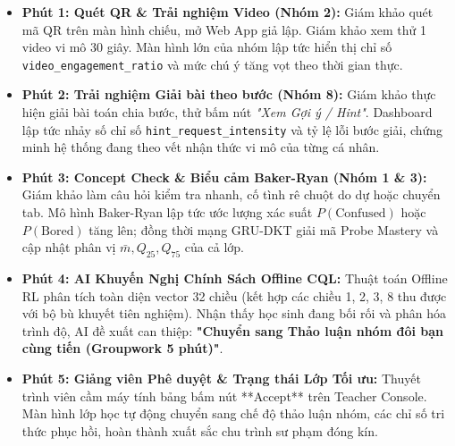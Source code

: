 \documentclass[11pt,a4paper]{article}
\begin{document}
\begin{stepbox}
\begin{itemize}
  \item \textbf{Phút 1: Quét QR \& Trải nghiệm Video (Nhóm 2):} Giám khảo quét mã QR trên màn hình chiếu, mở Web App giả lập. Giám khảo xem thử 1 video vi mô 30 giây. Màn hình lớn của nhóm lập tức hiển thị chỉ số \texttt{video\_engagement\_ratio} và mức chú ý tăng vọt theo thời gian thực.
  \item \textbf{Phút 2: Trải nghiệm Giải bài theo bước (Nhóm 8):} Giám khảo thực hiện giải bài toán chia bước, thử bấm nút \textit{"Xem Gợi ý / Hint"}. Dashboard lập tức nhảy số chỉ số \texttt{hint\_request\_intensity} và tỷ lệ lỗi bước giải, chứng minh hệ thống đang theo vết nhận thức vi mô của từng cá nhân.
  \item \textbf{Phút 3: Concept Check \& Biểu cảm Baker-Ryan (Nhóm 1 \& 3):} Giám khảo làm câu hỏi kiểm tra nhanh, cố tình rê chuột do dự hoặc chuyển tab. Mô hình Baker-Ryan lập tức ước lượng xác suất $P(\text{Confused})$ hoặc $P(\text{Bored})$ tăng lên; đồng thời mạng GRU-DKT giải mã Probe Mastery và cập nhật phân vị $\bar{m}, Q_{25}, Q_{75}$ của cả lớp.
  \item \textbf{Phút 4: AI Khuyến Nghị Chính Sách Offline CQL:} Thuật toán Offline RL phân tích toàn diện vector 32 chiều (kết hợp các chiều 1, 2, 3, 8 thu được với bộ bù khuyết tiên nghiệm). Nhận thấy học sinh đang bối rối và phân hóa trình độ, AI đề xuất can thiệp: \textbf{"Chuyển sang Thảo luận nhóm đôi bạn cùng tiến (Groupwork 5 phút)"}.
  \item \textbf{Phút 5: Giảng viên Phê duyệt \& Trạng thái Lớp Tối ưu:} Thuyết trình viên cầm máy tính bảng bấm nút **Accept** trên Teacher Console. Màn hình lớp học tự động chuyển sang chế độ thảo luận nhóm, các chỉ số tri thức phục hồi, hoàn thành xuất sắc chu trình sư phạm đóng kín.
\end{itemize}
\end{stepbox}
\end{document}
